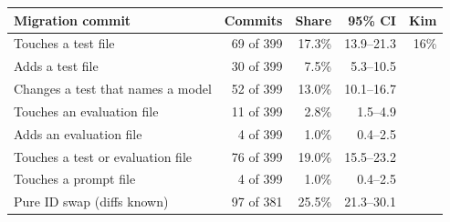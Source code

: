 \begin{tabular}{lrrrr}
\toprule
Migration commit & Commits & Share & 95\% CI & Kim \\
\midrule
Touches a test file & 69 of 399 & 17.3\% & 13.9--21.3 & 16\% \\
Adds a test file & 30 of 399 & 7.5\% & 5.3--10.5 &  \\
Changes a test that names a model & 52 of 399 & 13.0\% & 10.1--16.7 &  \\
Touches an evaluation file & 11 of 399 & 2.8\% & 1.5--4.9 &  \\
Adds an evaluation file & 4 of 399 & 1.0\% & 0.4--2.5 &  \\
Touches a test or evaluation file & 76 of 399 & 19.0\% & 15.5--23.2 &  \\
Touches a prompt file & 4 of 399 & 1.0\% & 0.4--2.5 &  \\
Pure ID swap (diffs known) & 97 of 381 & 25.5\% & 21.3--30.1 &  \\
\bottomrule
\end{tabular}

